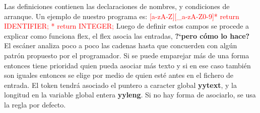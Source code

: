 \documentclass{beamer}
\begin{document}
\begin{frame}
Las definiciones contienen las declaraciones de nombres, y condiciones de arranque. Un ejemplo de nuestro programa es: \newline 
\textcolor{red}{[a-zA-Z][\_a-zA-Z0-9]*   return IDENTIFIER; \newline [0-9][0-9]*    return INTEGER;} \newline 
Luego de definir estos campos se procede a explicar como funciona flex, el flex asocia las entradas, \textbf{?`pero c\'omo lo hace?}\newline 
El esc\'aner analiza poco a poco las cadenas hasta que concuerden con alg\'un patr\'on propuesto por el programador. Si se puede emparejar m\'as de una forma entonces tiene prioridad quien pueda asociar m\'as texto y si en ese caso tambi\'en son iguales entonces se elige por medio de quien est\'e antes en el fichero de entrada.\newline 
El token tendr\'a asociado el puntero a caracter global \textbf{yytext}, y la longitud en la variable global entera \textbf{yyleng}. Si no hay forma de asociarlo, se usa la regla por defecto. \newline 
\end{frame}
\end{document}
